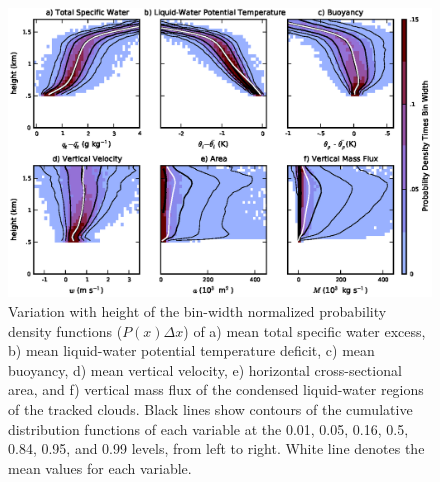 \documentclass[acp]{copernicus}
\begin{document}
\begin{figure}[t]
\vspace*{2mm}
\begin{center}
\includegraphics[width=\textwidth]{./figures/mean_profiles}
\end{center}
\caption{Variation with height of the bin-width normalized probability 
density functions ($P(x) \Delta x$) of a) mean total specific water excess, 
b) mean liquid-water potential temperature deficit, c) mean buoyancy, d) mean 
vertical velocity, e) horizontal cross-sectional area, and f) vertical mass 
flux of the condensed liquid-water regions of the tracked clouds.  Black lines 
show contours of the cumulative distribution functions of each variable at the 
0.01, 0.05, 0.16, 0.5, 0.84, 0.95, and 0.99 levels, from left to right.  White 
line denotes the mean values for each variable. }
\label{fig:mean_profiles}
\end{figure}
\end{document}
